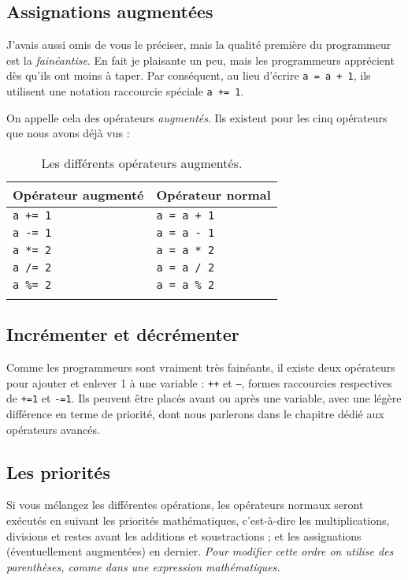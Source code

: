 \subsection{Assignations augmentées}


J'avais aussi omis de vous le préciser, mais la qualité première du programmeur est la \emph{fainéantise}. En fait je plaisante un peu, mais les programmeurs apprécient dès qu'ils ont moins à taper.
Par conséquent, au lieu d'écrire \texttt{a = a + 1},
ils utilisent une notation raccourcie spéciale \texttt{a += 1}.

On appelle cela des opérateurs \emph{augmentés}. Ils existent pour les cinq opérateurs que nous avons déjà vus :

\begin{longtabu} to \linewidth {|X[,l,m]|X[,l,m]|}
\hline Opérateur augmenté & Opérateur normal \\ \hline
\endhead
\texttt{a += 1} & \texttt{a = a + 1} \\ \hline
\texttt{a -= 1} & \texttt{a = a - 1} \\ \hline
\texttt{a *= 2} & \texttt{a = a * 2} \\ \hline
\texttt{a /= 2} & \texttt{a = a / 2} \\ \hline
\texttt{a \%= 2} & \texttt{a = a \% 2} \\ \hline
\caption{Les différents opérateurs augmentés.}
\end{longtabu}

\subsection{Incrémenter et décrémenter}
Comme les programmeurs sont vraiment très fainéants, il existe deux opérateurs pour ajouter et enlever 1 à une variable : \texttt{++} et \texttt{--}, formes raccourcies respectives de \texttt{+=1} et \texttt{-=1}. Ils peuvent être placés avant ou après une variable, avec une légère différence en terme de priorité, dont nous parlerons dans le chapitre dédié aux opérateurs avancés.
\subsection{Les priorités}
Si vous mélangez les différentes opérations, les opérateurs normaux seront exécutés en suivant les priorités mathématiques, c'est-à-dire les multiplications, divisions et restes avant les additions et soustractions ; et les assignations (éventuellement augmentées) en dernier.
\emph{Pour modifier cette ordre on utilise des parenthèses, comme dans une expression mathématiques.}
